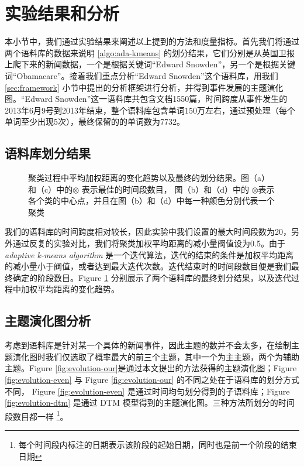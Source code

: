 \section{实验结果和分析}
本小节中，我们通过实验结果来阐述以上提到的方法和度量指标。首先我们将通过两个语料库的数据来说明 \ref{algo:ada-kmeans} 的划分结果，它们分别是从英国卫报上爬下来的新闻数据，一个是根据关键词“Edward Snowden”，另一个是根据关键词“Obamacare”。接着我们重点分析“Edward Snowden”这个语料库，用我们 \ref{sec:framework} 小节中提出的分析框架进行分析，并得到事件发展的主题演化图。“Edward Snowden”这一语料库共包含文档1550篇，时间跨度从事件发生的2013年6月9号到2013年结束，整个语料库包含单词150万左右，通过预处理（每个单词至少出现5次），最终保留的的单词数为7732。
\subsection{语料库划分结果}
\label{sec:ada-kmeans-result}
\begin{figure}[htb]
	\caption{聚类过程中平均加权距离的变化趋势以及最终的划分结果。图（a）和（c）中的$\otimes$ 表示最佳的时间段数目， 图（b）和（d）中的 $\otimes$表示各个类的中心点，并且在图（b）和（d）中每一种颜色分别代表一个聚类}
	\label{fig:cluster}
\end{figure}
我们的语料库的时间跨度相对较长，因此实验中我们设置的最大时间段数为20，另外通过反复的实验对比，我们将聚类加权平均距离的减小量阀值设为0.5。由于 \emph{adaptive k-means algorithm} 是一个迭代算法，迭代的结束的条件是加权平均距离的减小量小于阀值，或者达到最大迭代次数。迭代结束时的时间段数目便是我们最终确定的阶段数目。Figure \ref{fig:cluster} 分别展示了两个语料库的最终划分结果，以及迭代过程中加权平均距离的变化趋势。

\subsection{主题演化图分析}
\label{sec:evolution-map}
考虑到语料库是针对某一个具体的新闻事件，因此主题的数并不会太多，在绘制主题演化图时我们仅选取了概率最大的前三个主题，其中一个为主主题，两个为辅助主题。Figure \ref{fig:evolution-our}是通过本文提出的方法获得的主题演化图；Figure \ref{fig:evolution-even} 与 Figure \ref{fig:evolution-our} 的不同之处在于语料库的划分方式不同， Figure \ref{fig:evolution-even}  是通过时间均匀划分得到的子语料库；Figure \ref{fig:evolution-dtm} 是通过 DTM 模型得到的主题演化图。三种方法所划分的时间段数目都一样 \footnote{每个时间段内标注的日期表示该阶段的起始日期，同时也是前一个阶段的结束日期}。

